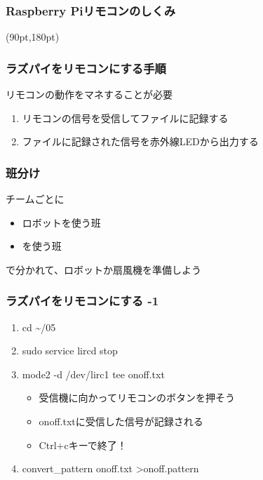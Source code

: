 \begin{frame}
    \frametitle{Raspberry Piリモコンのしくみ}
    \vspace{12pt}
    \begin{center}
        
    \end{center}
    \begin{textblock*}{0.4\linewidth}(90pt,180pt)
    \end{textblock*}
\end{frame}

\begin{frame}
    \frametitle{ラズパイをリモコンにする手順} 
    リモコンの動作をマネすることが必要
    \begin{enumerate}
        \item リモコンの信号を受信してファイルに記録する
        \item ファイルに記録された信号を赤外線LEDから出力する
    \end{enumerate}
\end{frame}

\begin{frame}
    \frametitle{班分け}
    チームごとに
    \begin{itemize}
        \item ロボットを使う班
        \item {}を使う班
    \end{itemize}
    で分かれて、ロボットか扇風機を準備しよう
\end{frame}

\begin{frame}
    \frametitle{ラズパイをリモコンにする -1} 
    \begin{enumerate}
        \item cd \textasciitilde/05
        \item sudo service lircd stop
        \item mode2 -d /dev/lirc1 \textbar tee onoff.txt
        \begin{itemize}
            \item 受信機に向かってリモコンのボタンを押そう
            \item onoff.txtに受信した信号が記録される
            \item Ctrl+cキーで終了！
        \end{itemize}
        \item convert\_pattern onoff.txt \textgreater \space onoff.pattern
    \end{enumerate}
\end{frame}

